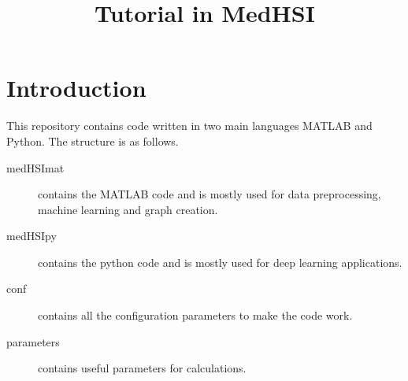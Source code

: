\documentclass{foxelas_report}
\title{Tutorial in MedHSI}
\begin{document}
\setcounter{page}{1}

\maketitle

\section{Introduction}

\par This repository contains code written in two main languages MATLAB and Python. The structure is as follows. 

\begin{description}
\item [medHSImat] contains the MATLAB code and is mostly used for data preprocessing, machine learning and graph creation.
\item [medHSIpy] contains the python code and is mostly used for deep learning applications. 
\item [conf] contains all the configuration parameters to make the code work.
\item [parameters] contains useful parameters for calculations. 
\end{description}
\end{document}
